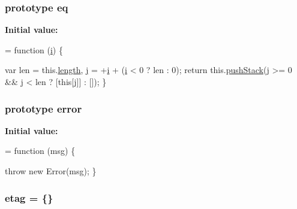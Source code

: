 \subsubsection[{\texorpdfstring{eq}{eq}}]{ {\bf prototype} eq}\hypertarget{jquery-2_82_81-vsdoc_8js_a57adf3cfa88f689534e187b77491d52d}{}\label{jquery-2_82_81-vsdoc_8js_a57adf3cfa88f689534e187b77491d52d}
{\bfseries Initial value\+:}
\begin{DoxyCode}
= \textcolor{keyword}{function} (\hyperlink{geolocation-marker_8js_a0325b7ce0988782a8032e720ef3aa411}{i}) \{
        

        var len = this.\hyperlink{jquery-2_82_81-vsdoc_8js_aa7de35d58da66d9944ab9cbe82c19640}{length},
            \hyperlink{geolocation-marker_8js_af0ba8fb208a5f5ab73eb0859811a23f8}{j} = +\hyperlink{geolocation-marker_8js_a0325b7ce0988782a8032e720ef3aa411}{i} + (\hyperlink{geolocation-marker_8js_a0325b7ce0988782a8032e720ef3aa411}{i} < 0 ? len : 0);
        \textcolor{keywordflow}{return} this.\hyperlink{jquery-2_82_81-vsdoc_8js_afc3a7db1ef2b526338c06c07cecccd44}{pushStack}(j >= 0 && j < len ? [\textcolor{keyword}{this}[j]] : []);
    \}
\end{DoxyCode}
\subsubsection[{\texorpdfstring{error}{error}}]{ {\bf prototype} error}\hypertarget{jquery-2_82_81-vsdoc_8js_acd25716dc66c2c57df2fc97807ffbddf}{}\label{jquery-2_82_81-vsdoc_8js_acd25716dc66c2c57df2fc97807ffbddf}
{\bfseries Initial value\+:}
\begin{DoxyCode}
= \textcolor{keyword}{function} (msg) \{
        

        \textcolor{keywordflow}{throw} \textcolor{keyword}{new} Error(msg);
    \}
\end{DoxyCode}
\subsubsection[{\texorpdfstring{etag}{etag}}]{ etag = \{\}}\hypertarget{jquery-2_82_81-vsdoc_8js_afef53404a8ff79eab1ee39c165d6ba37}{}\label{jquery-2_82_81-vsdoc_8js_afef53404a8ff79eab1ee39c165d6ba37}
